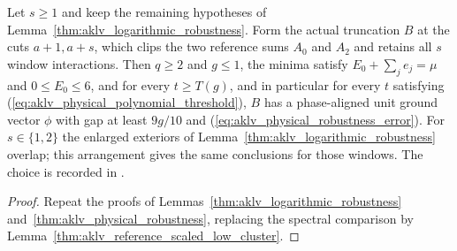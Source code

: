 \begin{lemma}
    \label{thm:aklv_reference_robustness}
    \leanok
    Let $s\ge1$ and keep the remaining hypotheses of
    Lemma~\ref{thm:aklv_logarithmic_robustness}. Form the actual
    truncation $B$ at the cuts $a+1,a+s$, which clips the two reference sums
    $A_0$ and $A_2$ and retains all $s$ window interactions. Then $q\ge2$ and
    $g\le1$, the minima satisfy $E_0+\sum_je_j=\mu$ and $0\le E_0\le6$, and for
    every $t\ge T(g)$, and in particular for every $t$ satisfying
    (\ref{eq:aklv_physical_polynomial_threshold}), $B$ has a phase-aligned
    unit ground vector $\phi$ with gap at least $9g/10$ and
    (\ref{eq:aklv_physical_robustness_error}).
    For $s\in\{1,2\}$ the enlarged exteriors of
    Lemma~\ref{thm:aklv_logarithmic_robustness} overlap; this arrangement
    gives the same conclusions for those windows. The choice is recorded in
    \cite{gap:aklv13_two_block_robustness}.
\end{lemma}
\begin{proof}
    \leanok
    Repeat the proofs of Lemmas~\ref{thm:aklv_logarithmic_robustness}
    and~\ref{thm:aklv_physical_robustness}, replacing the spectral
    comparison by Lemma~\ref{thm:aklv_reference_scaled_low_cluster}.
\end{proof}

